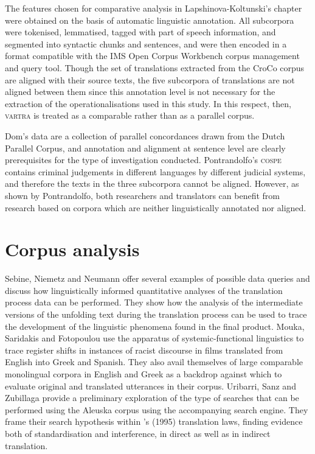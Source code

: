 \documentclass[output=paper]{LSP/langsci}
\begin{document}
The features chosen for comparative analysis in Lapshinova-Koltunski’s chapter were obtained on the basis of automatic linguistic annotation. All subcorpora were tokenised, lemmatised, tagged with part of speech information, and segmented into syntactic chunks and sentences, and were then encoded in a format compatible with the IMS Open Corpus Workbench corpus management and query tool. Though the set of translations extracted from the CroCo corpus are aligned with their source texts, the five subcorpora of translations are not aligned between them since this annotation level is not necessary for the extraction of the operationalisations used in this study. In this respect, then, \textsc{vartra} is treated as a comparable rather than as a parallel corpus.

Dom’s data are a collection of parallel concordances drawn from the Dutch Parallel Corpus, and annotation and alignment at sentence level are clearly prerequisites for the type of investigation conducted. Pontrandolfo’s \textsc{cospe} contains criminal judgements in different languages by different judicial systems, and therefore the texts in the three subcorpora cannot be aligned. However, as shown by Pontrandolfo, both researchers and translators can benefit from research based on corpora which are neither linguistically annotated nor aligned. 

\section{Corpus analysis}
Sebine, Niemetz and Neumann offer several examples of possible data queries and discuss how linguistically informed quantitative analyses of the translation process data can be performed. They show how the analysis of the intermediate versions of the unfolding text during the translation process can be used to trace the development of the linguistic phenomena found in the final product. Mouka, Saridakis and Fotopoulou use the apparatus of systemic-functional linguistics to trace register shifts in instances of racist discourse in films translated from English into Greek and Spanish. They also avail themselves of large comparable monolingual corpora in English and Greek as a backdrop against which to evaluate original and translated utterances in their corpus. Uribarri, Sanz and Zubillaga provide a preliminary exploration of the type of searches that can be performed using the Aleuska corpus using the accompanying search engine. They frame their search hypothesis within \citeauthor{Toury1995}'s (1995) translation laws, finding evidence both of standardisation and interference, in direct as well as in indirect translation. 
\end{document}
